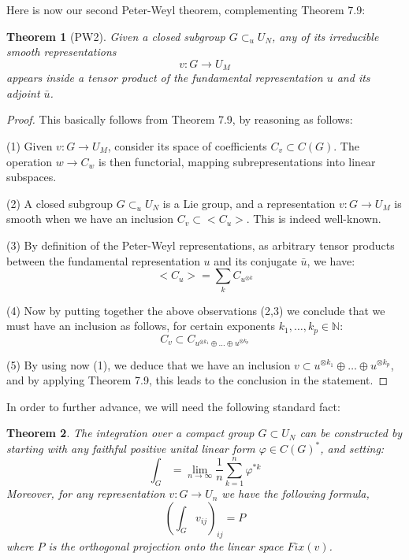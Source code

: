 \documentclass[12pt]{amsbook}
\newtheorem{theorem}{Theorem}[chapter]
\begin{document}
Here is now our second Peter-Weyl theorem, complementing Theorem 7.9:

\begin{theorem}[PW2]
Given a closed subgroup $G\subset_uU_N$, any of its irreducible smooth representations 
$$v:G\to U_M$$
appears inside a tensor product of the fundamental representation $u$ and its adjoint $\bar{u}$.
\end{theorem}

\begin{proof}
This basically follows from Theorem 7.9, by reasoning as follows:

\medskip

(1) Given $v:G\to U_M$, consider its space of coefficients $C_v\subset C(G)$. The operation $w\to C_w$ is then functorial, mapping subrepresentations into linear subspaces.

\medskip

(2) A closed subgroup $G\subset_uU_N$ is a Lie group, and a representation $v:G\to U_M$ is smooth when we have an inclusion $C_v\subset<C_u>$. This is indeed well-known.

\medskip

(3) By definition of the Peter-Weyl representations, as arbitrary tensor products between the fundamental representation $u$ and its conjugate $\bar{u}$, we have:
$$<C_u>=\sum_kC_{u^{\otimes k}}$$

(4) Now by putting together the above observations (2,3) we conclude that we must have an inclusion as follows, for certain exponents $k_1,\ldots,k_p\in\mathbb N$:
$$C_v\subset C_{u^{\otimes k_1}\oplus\ldots\oplus u^{\otimes k_p}}$$

(5) By using now (1), we deduce that we have an inclusion $v\subset u^{\otimes k_1}\oplus\ldots\oplus u^{\otimes k_p}$, and by applying Theorem 7.9, this leads to the conclusion in the statement.
\end{proof}

In order to further advance, we will need the following standard fact:


\begin{theorem}
The integration over a compact group $G\subset U_N$ can be constructed by starting with any faithful positive unital linear form $\varphi\in C(G)^*$, and setting:
$$\int_G=\lim_{n\to\infty}\frac{1}{n}\sum_{k=1}^n\varphi^{*k}$$
Moreover, for any representation $v:G\to U_n$ we have the following formula,
$$\left(\int_Gv_{ij}\right)_{ij}=P$$
where $P$ is the orthogonal projection onto the linear space $Fix(v)$.
\end{theorem}
\end{document}

